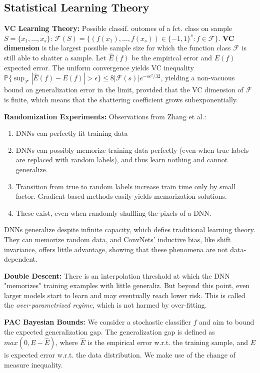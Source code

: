 \subsection{Statistical Learning Theory}
\textbf{VC Learning Theory:} Possible classif. outomes of a fct. class on sample $S = \{x_1,\dots,x_s\}$: $\mathcal{F}(S)=\{(f(x_1),\dots,f(x_s)) \in \{-1,1\}^s: f \in \mathcal{F} \}$.
\textbf{VC dimension} is the largest possible sample size for which the function
 class $\mathcal{F}$ is still able to shatter a sample. Let $\hat{E}(f)$ be the empirical error and $E(f)$ expected error. The uniform convergence yields VC inequality $\mathbb{P}\{ \sup_{\mathcal{F}} |\hat{E}(f) - E(f)| > \epsilon \} \leq 8 |\mathcal{F}(s)|e^{-s\epsilon^2/32}$, yielding a non-vacuous bound on generalization error in the limit, provided that the VC dimension of $\mathcal{F}$ is finite, which means that the
 shattering coefficient grows subexponentially. 
 
 \textbf{Randomization Experiments:} Observations from Zhang et al.:
 \begin{enumerate}
     \item DNNs can perfectly fit training data
     \item DNNs can possibly memorize training data perfectly (even when true labels are replaced with random labels), and thus learn nothing and cannot generalize.
     \item Transition from true to random labels increase train time only by small factor. Gradient-based methods easily yields memorization solutions.
     \item These exist, even when randomly shuffling the pixels of a DNN.
 \end{enumerate}
DNNs generalize despite infinite capacity, which defies traditional learning theory. They can memorize random data, and ConvNets’ inductive bias, like shift invariance, offers little advantage, showing that these phenomena are not data-dependent.
 
\textbf{Double Descent:} There is an interpolation threshold at which the DNN
"memorizes" training examples with little generaliz. But beyond this point, even larger models start to learn and may eventually reach lower risk. This is called the \emph{over-parametrized regime}, which is not harmed by over-fitting.

\textbf{PAC Bayesian Bounds:} We consider a stochastic classifier $f$ and aim to bound the expected generalization gap. The generalization gap is defined as $max(0, E - \hat{E})$, where $\hat{E}$ is the empirical error w.r.t. the training sample, and $E$ is expected error w.r.t. the data distribution. We make use of the change of measure inequality.

